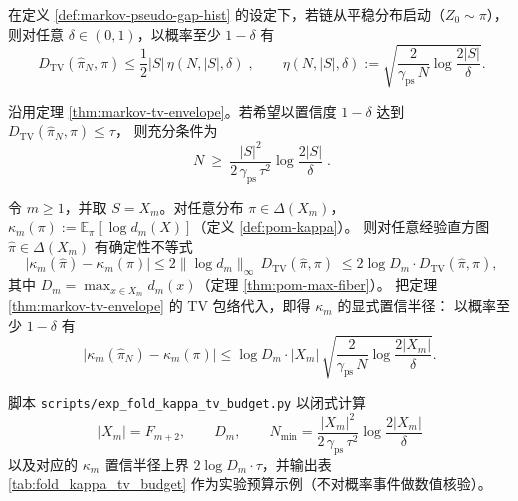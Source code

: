 \begin{theorem}\label{thm:markov-tv-envelope}
在定义 \ref{def:markov-pseudo-gap-hist} 的设定下，若链从平稳分布启动（\(Z_0\sim\pi\)），则对任意 \(\delta\in(0,1)\)，以概率至少 \(1-\delta\) 有
\[
\boxed{\;
D_{\mathrm{TV}}(\hat{\pi}_N,\pi)\le \frac12|S|\,\eta(N,|S|,\delta)\;},
\qquad
\eta(N,|S|,\delta):=\sqrt{\frac{2}{\gamma_{\mathrm{ps}}\,N}\log\frac{2|S|}{\delta}}.
\]
\end{theorem}

\begin{corollary}\label{cor:markov-tv-sample-complexity}
沿用定理 \ref{thm:markov-tv-envelope}。若希望以置信度 \(1-\delta\) 达到
\(
D_{\mathrm{TV}}(\hat{\pi}_N,\pi)\le \tau
\)，
则充分条件为
\[
\boxed{\;
N\ \ge\ \frac{|S|^{2}}{2\,\gamma_{\mathrm{ps}}\,\tau^{2}}
\log\frac{2|S|}{\delta}\; }.
\]
\end{corollary}

\begin{corollary}\label{cor:kappa-confidence-from-tv}
令 \(m\ge 1\)，并取 \(S=X_m\)。对任意分布 \(\pi\in\Delta(X_m)\)，\(\kappa_m(\pi):=\mathbb{E}_{\pi}[\log d_m(X)]\)（定义 \ref{def:pom-kappa}）。
则对任意经验直方图 \(\hat{\pi}\in\Delta(X_m)\) 有确定性不等式
\[
\boxed{\;
\bigl|\kappa_m(\hat{\pi})-\kappa_m(\pi)\bigr|
\le 2\|\log d_m\|_{\infty}\,D_{\mathrm{TV}}(\hat{\pi},\pi)\;}
\le 2\log D_m\cdot D_{\mathrm{TV}}(\hat{\pi},\pi),
\]
其中 \(D_m=\max_{x\in X_m}d_m(x)\)（定理 \ref{thm:pom-max-fiber}）。
把定理 \ref{thm:markov-tv-envelope} 的 TV 包络代入，即得 \(\kappa_m\) 的显式置信半径：
以概率至少 \(1-\delta\) 有
\[
\bigl|\kappa_m(\hat{\pi}_N)-\kappa_m(\pi)\bigr|
\le \log D_m\cdot |X_m|\,
\sqrt{\frac{2}{\gamma_{\mathrm{ps}}\,N}\log\frac{2|X_m|}{\delta}}.
\]
\end{corollary}

\begin{remark}\label{rem:fold-kappa-tv-budget-repro}
脚本 \texttt{scripts/exp\_fold\_kappa\_tv\_budget.py} 以闭式计算
\[
|X_m|=F_{m+2},\qquad D_m,\qquad
N_{\min}=\frac{|X_m|^{2}}{2\,\gamma_{\mathrm{ps}}\,\tau^{2}}\log\frac{2|X_m|}{\delta}
\]
以及对应的 \(\kappa_m\) 置信半径上界 \(2\log D_m\cdot\tau\)，并输出表 \ref{tab:fold_kappa_tv_budget} 作为实验预算示例（不对概率事件做数值核验）。

\end{remark}

